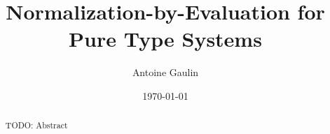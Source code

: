 \documentclass[sigplan,10pt,anonymous,review,nonacm]{acmart}\settopmatter{printfolios=true,printccs=false,printacmref=false}
\title{Normalization-by-Evaluation for Pure Type Systems}
\author{Antoine Gaulin}
\date{\today}
\begin{document}
\begin{abstract}
  TODO: Abstract
\end{abstract}

\maketitle



















\appendix




\end{document}
